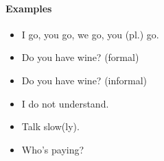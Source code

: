\paragraph{Examples}
\begin{itemize}
	\item I go, you go, we go, you (pl.) go.     \\
	
	\item Do you have wine? (formal)      \\
		
	\item Do you have wine? (informal)    \\
	
    \item I do not understand.            \\

    \item Talk slow(ly).                  \\

    \item Who's paying?                   \\
\end{itemize}

